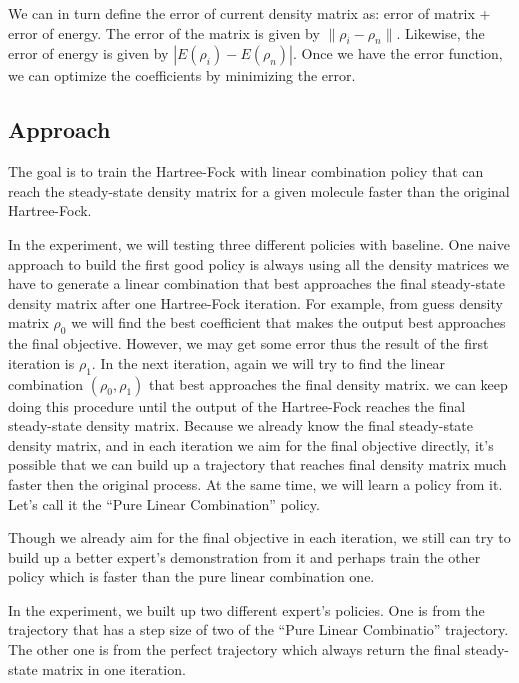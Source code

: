 \documentclass[twoside]{article}
\begin{document}
We can in turn define the error of current density matrix as: error of matrix +  error of energy. The error of the matrix is given by $\|\rho_i-\rho_n\|$. Likewise, the error of energy is given by $|E(\rho_i)-E(\rho_n)|$. Once we have the error function, we can optimize the coefficients by minimizing the error.




\subsection{Approach}
The goal is to train the Hartree-Fock with linear combination policy that can reach the steady-state density matrix for a given molecule faster than the original Hartree-Fock.

In the experiment, we will testing three different policies with baseline.
One naive approach to build the first good policy is always using all the density matrices we have to generate a linear combination that best approaches the final steady-state density matrix after one Hartree-Fock iteration.  For example, from guess density matrix $\rho_0$ we will find the best coefficient that makes the output best approaches the final objective. However, we may get some error thus the result of the first iteration is $\rho_1$.  In the next iteration, again we will try to find the linear combination $(\rho_0, \rho_1)$ that best approaches the final density matrix. we can keep doing this procedure until the output of the Hartree-Fock reaches the final steady-state density matrix.
Because we already know the final steady-state density matrix, and in each iteration we aim for the final objective directly, it's possible that we can build up a trajectory that reaches final density matrix much faster then the original process. At the same time, we will learn a policy from it. Let's call it the ``Pure Linear Combination'' policy.

Though we already aim for the final objective in each iteration, we still can try to build up a better expert's demonstration from it and perhaps train the other policy which is faster than the pure linear combination one.

In the experiment, we built up two different expert's policies. 
One is from the trajectory that has a step size of two of the ``Pure Linear Combinatio'' trajectory. The other one is from the perfect trajectory which always return the final steady-state matrix in one iteration.
\end{document}
